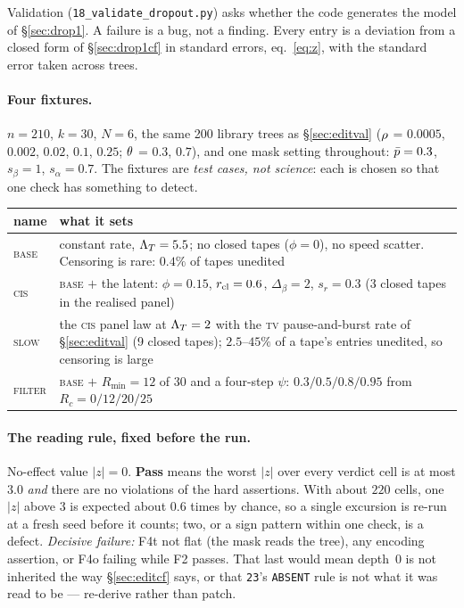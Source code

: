 Validation (\texttt{18\_validate\_dropout.py}) asks whether the code generates the model of
\S\ref{sec:drop1}. A failure is a bug, not a finding. Every entry is a deviation from a closed form of
\S\ref{sec:drop1cf} in standard errors, eq.~\eqref{eq:z}, with the standard error taken across trees.

\paragraph{Four fixtures.} $n=210$, $k=30$, $N=6$, the same 200 library trees as
\S\ref{sec:editval} ($\rho$ = $0.0005$, $0.002$, $0.02$, $0.1$, $0.25$; $\theta$ = $0.3$, $0.7$), and one mask
setting throughout: $\bar p=0.3$, $s_\beta=1$, $s_\alpha=0.7$. The fixtures are \emph{test cases, not
science}: each is chosen so that one check has something to detect.
\begin{center}\small
\begin{tabular}{@{}lp{}@{}}
\toprule
name & what it sets \\
\midrule
\textsc{base}   & constant rate, $\Lambda_T=5.5$; no closed tapes ($\phi=0$), no speed scatter.
                  Censoring is rare: $0.4\%$ of tapes unedited \\
\textsc{cis}    & \textsc{base} $+$ the latent: $\phi=0.15$, $r_{\rm cl}=0.6$, $\Delta_\beta=2$, $s_r=0.3$
                  (3 closed tapes in the realised panel) \\
\textsc{slow}   & the \textsc{cis} panel law at $\Lambda_T=2$ with the \textsc{tv} pause-and-burst rate of
                  \S\ref{sec:editval} (9 closed tapes); $2.5$--$45\%$ of a tape's entries unedited,
                  so censoring is large \\
\textsc{filter} & \textsc{base} $+$ $R_{\min}=12$ of $30$ and a four-step $\psi$:
                  $0.3/0.5/0.8/0.95$ from $R_c=0/12/20/25$ \\
\bottomrule
\end{tabular}
\end{center}

\paragraph{The reading rule, fixed before the run.} No-effect value $|z|=0$. \textbf{Pass} means the
worst $|z|$ over every verdict cell is at most $3.0$ \emph{and} there are no violations of the hard
assertions. With about $220$ cells, one $|z|$ above $3$ is expected about $0.6$ times by chance, so a
single excursion is re-run at a fresh seed before it counts; two, or a sign pattern within one check,
is a defect. \emph{Decisive failure:} F4t not flat (the mask reads the tree), any encoding
assertion, or F4o failing while F2 passes. That last would mean depth~0 is not inherited the way
\S\ref{sec:editcf} says, or that \texttt{23}'s \texttt{ABSENT} rule is not what it was read to be ---
re-derive rather than patch.

